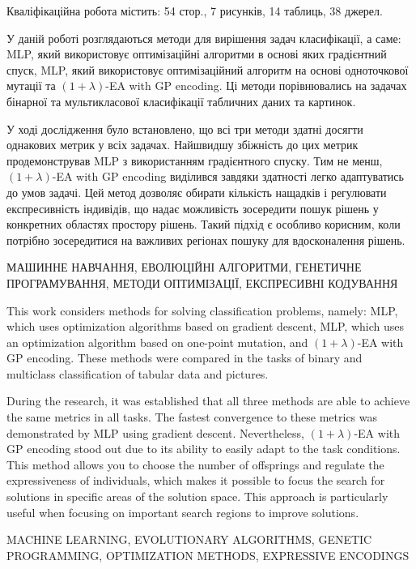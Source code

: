 
\abstractUkr

Кваліфікаційна робота містить: 54 стор., 7 рисунків, 14 таблиць, 38 джерел.

У даній роботі розглядаються методи для вирішення задач класифікації, а саме: MLP, який використовує оптимізаційні алгоритми в основі яких градієнтний спуск, MLP, який використовує оптимізаційний алгоритм на основі одноточкової мутації та $(1+\lambda)$-EA with GP encoding. Ці методи порівнювались на задачах бінарної та мультикласової класифікації табличних даних та картинок.

У ході дослідження було встановлено, що всі три методи здатні досягти однакових метрик у всіх задачах. Найшвидшу збіжність до цих метрик продемонстрував MLP з використанням градієнтного спуску. Тим не менш, $(1+\lambda)$-EA with GP encoding виділився завдяки здатності легко адаптуватись до умов задачі. Цей метод дозволяє обирати кількість нащадків і регулювати експресивність індивідів, що надає можливість зосередити пошук рішень у конкретних областях простору рішень. Такий підхід є особливо корисним, коли потрібно зосередитися на важливих регіонах пошуку для вдосконалення рішень.


\MakeUppercase{МАШИННЕ НАВЧАННЯ, ЕВОЛЮЦІЙНІ АЛГОРИТМИ, ГЕНЕТИЧНЕ ПРОГРАМУВАННЯ, МЕТОДИ ОПТИМІЗАЦІЇ, ЕКСПРЕСИВНІ КОДУВАННЯ}


%

\abstractEng

This work considers methods for solving classification problems, namely: MLP, which uses optimization algorithms based on gradient descent, MLP, which uses an optimization algorithm based on one-point mutation, and $(1+\lambda)$-EA with GP encoding. These methods were compared in the tasks of binary and multiclass classification of tabular data and pictures.

During the research, it was established that all three methods are able to achieve the same metrics in all tasks. The fastest convergence to these metrics was demonstrated by MLP using gradient descent. Nevertheless, $(1+\lambda)$-EA with GP encoding stood out due to its ability to easily adapt to the task conditions. This method allows you to choose the number of offsprings and regulate the expressiveness of individuals, which makes it possible to focus the search for solutions in specific areas of the solution space. This approach is particularly useful when focusing on important search regions to improve solutions.

\MakeUppercase{MACHINE LEARNING, EVOLUTIONARY ALGORITHMS, GENETIC PROGRAMMING, OPTIMIZATION METHODS, EXPRESSIVE ENCODINGS}

\clearpage